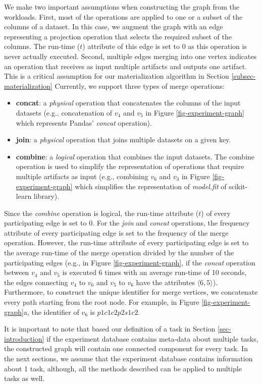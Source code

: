 We make two important assumptions when constructing the graph from the workloads.
First, most of the operations are applied to one or a subset of the columns of a dataset.
In this case, we augment the graph with an edge representing a projection operation that selects the required subset of the columns.
The run-time ($t$) attribute of this edge is set to 0 as this operation is never actually executed.
Second, multiple edges merging into one vertex indicates an operation that receives as input multiple artifacts and outputs one artifact.
This is a critical assumption for our materialization algorithm in Section \ref{subsec-materialization}
Currently, we support three types of merge operations:
\begin{itemize}
\item \textbf{concat}: a \textit{physical} operation that concatenates the columns of the input datasets (e.g., concatenation of $v_4$ and $v_5$ in Figure \ref{fig-experiment-graph} which represents Pandas' \textit{concat} operation).
\item \textbf{join}: a \textit{physical} operation that joins multiple datasets on a given key.
\item \textbf{combine}: a \textit{logical} operation that combines the input datasets. The combine operation is used to simplify the representation of operations that require multiple artifacts as input (e.g., combining $v_6$ and $v_3$ in Figure \ref{fig-experiment-graph} which simplifies the representation of \textit{model.fit} of scikit-learn library).
\end{itemize}
Since the \textit{combine} operation is logical, the run-time attribute ($t$) of every participating edge is set to $0$.
For the \textit{join} and \textit{concat} operations, the frequency attribute of every participating edge is set to the frequency of the merge operation.
However, the run-time attribute of every participating edge is set to the average run-time of the merge operation divided by the number of the participating edges (e.g., in Figure \ref{fig-experiment-graph}, if the \textit{concat} operation between $v_4$ and $v_5$ is executed 6 times with an average run-time of 10 seconds, the edges connecting $v_4$ to $v_6$ and $v_5$ to $v_6$ have the attributes $\langle6, 5\rangle$).
Furthermore, to construct the unique identifier for merge vertices, we concatenate every path starting from the root node.
For example, in Figure \ref{fig-experiment-graph}a, the identifier of $v_6$ is $p1c1c2p2s1c2$.

It is important to note that based our definition of a task in Section \ref{sec-introduction} if the experiment database contains meta-data about multiple tasks, the constructed graph will contain one connected component for every task.
In the next sections, we assume that the experiment database contains information about 1 task, although, all the methods described can be applied to multiple tasks as well.


